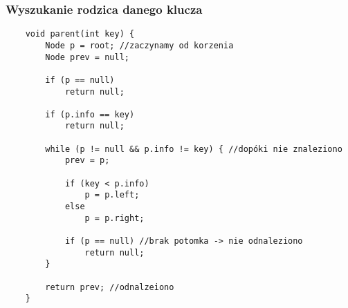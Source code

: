 \documentclass[algorytmy.tex]{subfiles}
\begin{document}
\pagebreak






\subsubsection{Wyszukanie rodzica danego klucza}
\begin{verbatim}
    void parent(int key) {
        Node p = root; //zaczynamy od korzenia
        Node prev = null;

        if (p == null)
            return null;

        if (p.info == key)
            return null;

        while (p != null && p.info != key) { //dopóki nie znaleziono
            prev = p;

            if (key < p.info)
                p = p.left;
            else
                p = p.right;

            if (p == null) //brak potomka -> nie odnaleziono
                return null;
        }

        return prev; //odnalzeiono
    }
\end{verbatim}
\end{document}
